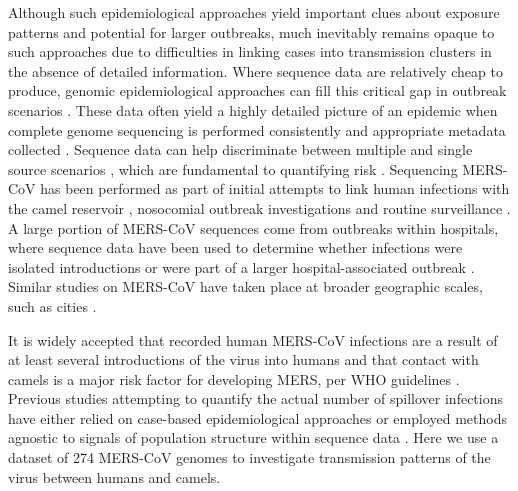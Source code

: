 \documentclass[11pt,oneside,letterpaper]{article}
\begin{document}
Although such epidemiological approaches yield important clues about exposure patterns and potential for larger outbreaks, much inevitably remains opaque to such approaches due to difficulties in linking cases into transmission clusters in the absence of detailed information.
Where sequence data are relatively cheap to produce, genomic epidemiological approaches can fill this critical gap in outbreak scenarios \citep{liu_h7n9_2013,gire_genomic_2014,grubaugh_multiple_2017}.
These data often yield a highly detailed picture of an epidemic when complete genome sequencing is performed consistently and appropriate metadata collected \citep{dudas_virus_2017}.
Sequence data can help discriminate between multiple and single source scenarios \citep{gire_genomic_2014,quick_rapid_2015}, which are fundamental to quantifying risk \citep{grubaugh_multiple_2017}.
Sequencing MERS-CoV has been performed as part of initial attempts to link human infections with the camel reservoir \citep{memish_human_2014}, nosocomial outbreak investigations \citep{assiri_hospital_2013} and routine surveillance \citep{park_acute_2015}.
A large portion of MERS-CoV sequences come from outbreaks within hospitals, where sequence data have been used to determine whether infections were isolated introductions or were part of a larger hospital-associated outbreak \citep{fagbo_molecular_2015}.
Similar studies on MERS-CoV have taken place at broader geographic scales, such as cities \citep{cotten_2013}.


It is widely accepted that recorded human MERS-CoV infections are a result of at least several introductions of the virus into humans \citep{cotten_2013} and that contact with camels is a major risk factor for developing MERS, per WHO guidelines \citep{who_mers_guidelines_2016}.
Previous studies attempting to quantify the actual number of spillover infections have either relied on case-based epidemiological approaches \citep{cauchemez_unraveling_2016} or employed methods agnostic to signals of population structure within sequence data \citep{zhang_evolutionary_2016}.
Here we use a dataset of 274 MERS-CoV genomes to investigate transmission patterns of the virus between humans and camels.
\end{document}
